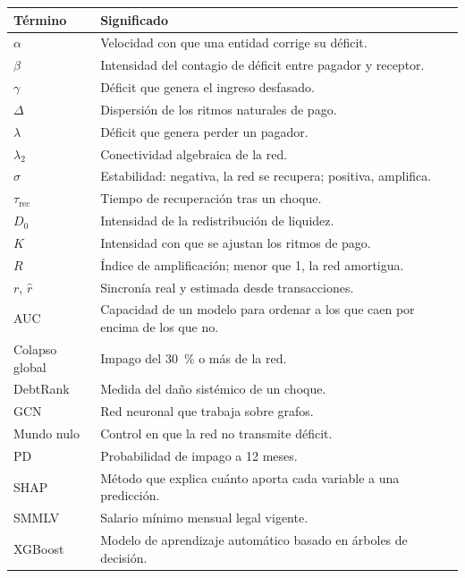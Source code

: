 \begin{longtable}{p{}p{}}
\toprule
\textbf{Término} & \textbf{Significado} \\
\midrule
\endhead
$\alpha$ & Velocidad con que una entidad corrige su déficit. \\
$\beta$ & Intensidad del contagio de déficit entre pagador y receptor. \\
$\gamma$ & Déficit que genera el ingreso desfasado. \\
$\Delta$ & Dispersión de los ritmos naturales de pago. \\
$\lambda$ & Déficit que genera perder un pagador. \\
$\lambda_2$ & Conectividad algebraica de la red. \\
$\sigma$ & Estabilidad: negativa, la red se recupera; positiva, amplifica. \\
$\tau_\text{rec}$ & Tiempo de recuperación tras un choque. \\
$D_0$ & Intensidad de la redistribución de liquidez. \\
$K$ & Intensidad con que se ajustan los ritmos de pago. \\
$R$ & Índice de amplificación; menor que 1, la red amortigua. \\
$r$, $\hat r$ & Sincronía real y estimada desde transacciones. \\
AUC & Capacidad de un modelo para ordenar a los que caen por encima de los que no. \\
Colapso global & Impago del 30~\% o más de la red. \\
DebtRank & Medida del daño sistémico de un choque. \\
GCN & Red neuronal que trabaja sobre grafos. \\
Mundo nulo & Control en que la red no transmite déficit. \\
PD & Probabilidad de impago a 12 meses. \\
SHAP & Método que explica cuánto aporta cada variable a una predicción. \\
SMMLV & Salario mínimo mensual legal vigente. \\
XGBoost & Modelo de aprendizaje automático basado en árboles de decisión. \\
\bottomrule
\end{longtable}
